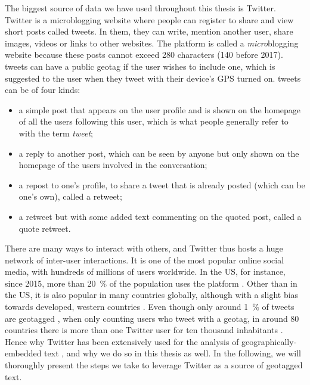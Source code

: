 \documentclass[../thesis.tex]{subfiles}
\begin{document}
The biggest source of data we have used throughout this thesis is Twitter. Twitter is a
microblogging website where people can register to share and view short posts called
tweets. In them, they can write, mention another user, share images, videos or links to
other websites. The platform is called a \emph{micro}blogging website because these
posts cannot exceed 280 characters (140 before 2017). tweets
can have a public geotag if the user wishes to include one, which is suggested to the
user when they tweet with their device's GPS turned on. tweets can be of four kinds:
\begin{itemize}
  \item a simple post that appears on the user profile and is shown on the homepage of
  all the users following this user, which is what people generally refer to with the
  term \emph{tweet};
  \item a reply to another post, which can be seen by anyone but only shown on the
  homepage of the users involved in the conversation;
  \item a repost to one's profile, to share a tweet that is already posted (which can be
  one's own), called a retweet;
  \item a retweet but with some added text commenting on the quoted post, called
  a quote retweet.
\end{itemize}
There are many ways to interact with others, and Twitter thus hosts a huge network of
inter-user interactions. It is one of the most popular online social media, with
hundreds of millions of users worldwide. In the US, for instance, since 2015, more than
\SI{20}{\percent} of the population uses the platform \cite{AuxierSocialMedia2021}. Other
than in the US, it is also popular in many countries globally, although with a slight
bias towards developed, western countries \cite{HawelkaGeolocatedTwitter2014}. Even
though only around \SI{1}{\percent} of tweets are geotagged
\cite{MorstatterSampleGood2021}, when only counting users who tweet with a geotag, in
around 80 countries there is more than one Twitter user for ten thousand inhabitants
\cite{MocanuTwitterBabel2013}. Hence why Twitter has been extensively used for the
analysis of geographically-embedded text
\cite{ArthurHumanGeography2019,BokanyiRaceReligion2016,BokanyiScalingWords2019,GoncalvesCrowdsourcingDialect2014,GoncalvesLearningSpanish2016,GoncalvesMappingAmericanization2018,
GrieveMappingLexical2019,HuangUnderstandingRegional2016,KoyluUncoveringGeoSocial2018,MocanuTwitterBabel2013,NguyenAudienceUse2015,LamannaImmigrantCommunity2018},
and why we do so in this thesis as well. In the following, we will thoroughly present the
steps we take to leverage Twitter as a source of geotagged text.
\end{document}
